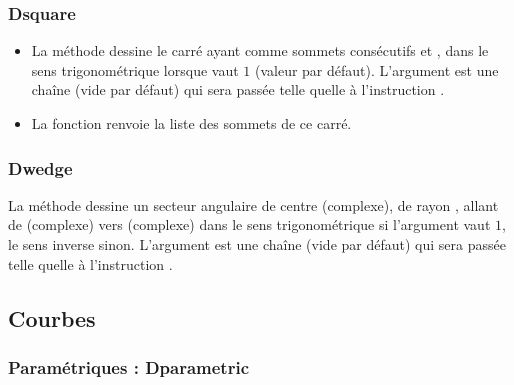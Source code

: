 \subsubsection{Dsquare}
\begin{itemize}
    \item La méthode  dessine le carré ayant comme sommets consécutifs  et , dans le sens trigonométrique lorsque  vaut $1$ (valeur par défaut). L'argument  est une chaîne (vide par défaut) qui sera passée telle quelle à l'instruction \drawcmd.
  \item La fonction  renvoie la liste des sommets de ce carré.
\end{itemize}

\subsubsection{Dwedge}
La méthode  dessine un secteur angulaire de centre  (complexe), de rayon , allant de  (complexe) vers  (complexe) dans le sens trigonométrique si l'argument  vaut $1$, le sens inverse sinon. L'argument  est une chaîne (vide par défaut) qui sera passée telle quelle à l'instruction \drawcmd.


\subsection{Courbes}

\subsubsection{Paramétriques : Dparametric}

